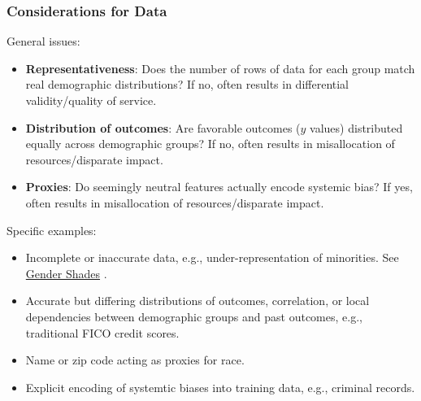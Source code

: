 \documentclass[11pt,aspectratio=169,hyperref={colorlinks}]{beamer}
\begin{document}
		\begin{frame}				
		
			\frametitle{Considerations for Data}

			\noindent \small General issues:\\
			\begin{itemize}\scriptsize
				\item\textbf{Representativeness}: Does the number of rows of data for each group match real demographic distributions? If no, often results in differential validity/quality of service.
				\item \textbf{Distribution of outcomes}: Are favorable outcomes ($y$ values) distributed equally across demographic groups? If no, often results in misallocation of resources/disparate impact. 
				\item \textbf{Proxies}: Do seemingly neutral features actually encode systemic bias? If yes, often results in misallocation of resources/disparate impact.   			
			\end{itemize}
			
			\noindent \small Specific examples:\\
			\begin{itemize}\scriptsize
				\item Incomplete or inaccurate data, e.g., under-representation of minorities. See \href{http://gendershades.org/}{Gender Shades} \cite{gender_shades}.
				\item Accurate but differing distributions of outcomes, correlation, or local dependencies between demographic groups and past outcomes, e.g., traditional FICO credit scores.
				\item Name or zip code acting as proxies for race.
				\item Explicit encoding of systemtic biases into training data, e.g., criminal records.
			\end{itemize}

		\end{frame}
\end{document}
